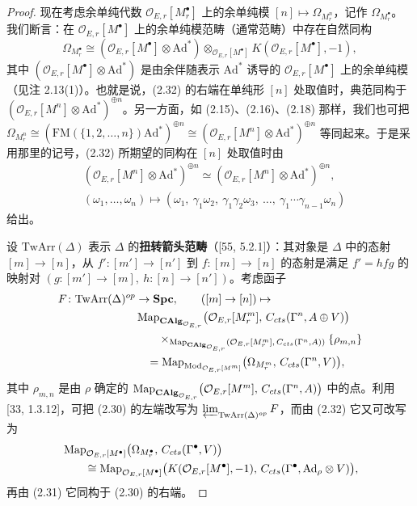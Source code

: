 \begin{proof}
现在考虑余单纯代数 $\mathcal O_{E,r}[M^\bullet_r]$ 上的余单纯模 $[n] \mapsto \Omega_{M^n_r}$，记作 $\Omega_{M^\bullet_r}$。我们断言：在 $\mathcal O_{E,r}[M^\bullet]$ 上的余单纯模范畴（通常范畴）中存在自然同构
\begin{equation}
\tag{2.32}
\Omega_{M^\bullet_r} \cong (\mathcal O_{E,r}[M^\bullet]\otimes\mathrm{Ad}^*)\otimes_{\mathcal O_{E,r}[M^\bullet]}K(\mathcal O_{E,r}[M^\bullet],-1),
\end{equation}
其中 $(\mathcal O_{E,r}[M^\bullet]\otimes\mathrm{Ad}^*)$ 是由余伴随表示 $\mathrm{Ad}^*$ 诱导的 $\mathcal O_{E,r}[M^\bullet]$ 上的余单纯模（见注 2.13(1)）。也就是说，(2.32) 的右端在单纯形 $[n]$ 处取值时，典范同构于 $(\mathcal O_{E,r}[M^n]\otimes\mathrm{Ad}^*)^{\oplus n}$。另一方面，如 (2.15)、(2.16)、(2.18) 那样，我们也可把 $\Omega_{M^n_r} \cong (\mathrm{FM}(\{1,2,\dots,n\})\mathrm{Ad}^*)^{\oplus n} \cong (\mathcal O_{E,r}[M^n]\otimes\mathrm{Ad}^*)^{\oplus n}$ 等同起来。于是采用那里的记号，(2.32) 所期望的同构在 $[n]$ 处取值时由
\[
\begin{aligned}
&(\mathcal O_{E,r}[M^n]\otimes\mathrm{Ad}^*)^{\oplus n} \simeq (\mathcal O_{E,r}[M^n]\otimes\mathrm{Ad}^*)^{\oplus n},\\
&(\omega_1,\dots,\omega_n) \mapsto (\omega_1,\ \gamma_1\omega_2,\ \gamma_1\gamma_2\omega_3,\ \dots,\ \gamma_1\cdots\gamma_{n-1}\omega_n)
\end{aligned}
\]
给出。

设 $\mathrm{TwArr}(\Delta)$ 表示 $\Delta$ 的\textbf{扭转箭头范畴}（[55, 5.2.1]）：其对象是 $\Delta$ 中的态射 $[m]\to[n]$，从 $f'\colon[m']\to[n']$ 到 $f\colon[m]\to[n]$ 的态射是满足 $f' = hfg$ 的映射对 $(g\colon[m']\to[m],\ h\colon[n]\to[n'])$。考虑函子
\[
\begin{aligned}
F\colon \mathrm{TwArr}(\Delta)^{op} &\to \mathbf{Spc},\qquad ([m]\to[n]) \mapsto \\
&\operatorname{Map}_{\mathbf{CAlg}_{\mathcal O_{E,r}}}\bigl(\mathcal O_{E,r}[M^m_r],\, C_{cts}(\Gamma^n, A\oplus V)\bigr)\\
&\qquad\times_{\operatorname{Map}_{\mathbf{CAlg}_{\mathcal O_{E,r}}}(\mathcal O_{E,r}[M^m_r],\, C_{cts}(\Gamma^n, A))}\{\rho_{m,n}\}\\
&\quad = \operatorname{Map}_{\operatorname{Mod}_{\mathcal O_{E,r}[M^m]}}\bigl(\Omega_{M^m_r},\, C_{cts}(\Gamma^n, V)\bigr),
\end{aligned}
\]
其中 $\rho_{m,n}$ 是由 $\rho$ 确定的 $\operatorname{Map}_{\mathbf{CAlg}_{\mathcal O_{E,r}}}\bigl(\mathcal O_{E,r}[M^m],\, C_{cts}(\Gamma^n, A)\bigr)$ 中的点。利用 [33, 1.3.12]，可把 (2.30) 的左端改写为 $\varprojlim_{\mathrm{TwArr}(\Delta)^{op}}F$，而由 (2.32) 它又可改写为
\[
\begin{aligned}
&\operatorname{Map}_{\mathcal O_{E,r}[M^\bullet]}\bigl(\Omega_{M^\bullet_r},\, C_{cts}(\Gamma^\bullet, V)\bigr)\\
&\qquad\cong \operatorname{Map}_{\mathcal O_{E,r}[M^\bullet]}\bigl(K(\mathcal O_{E,r}[M^\bullet], -1),\, C_{cts}(\Gamma^\bullet, \mathrm{Ad}_\rho\otimes V)\bigr),
\end{aligned}
\]
再由 (2.31) 它同构于 (2.30) 的右端。
\end{proof}

